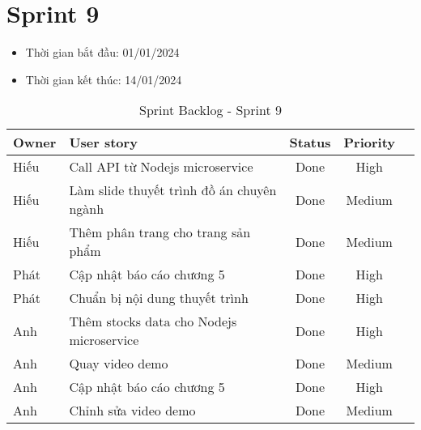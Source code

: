 \section{Sprint 9}
\begin{itemize}
    \item Thời gian bắt đầu: 01/01/2024
    \item Thời gian kết thúc: 14/01/2024
\end{itemize}
\begin{table}[H]
    \begin{tabular}{|m{2.5cm}|m{9cm}|c|c|c|}
    \hline
    \textbf{Owner}  & \textbf{User story}                                & \textbf{Status}  & \textbf{Priority} \\ \hline
    Hiếu               & Call API từ Nodejs microservice                    & Done                              & High         \\ \hline
    Hiếu              & Làm slide thuyết trình đồ án chuyên ngành                    & Done                              & Medium         \\ \hline
    Hiếu               & Thêm phân trang cho trang sản phẩm                    & Done                              & Medium         \\ \hline
    Phát               & Cập nhật báo cáo chương 5                    & Done                              & High        \\ \hline
    Phát               & Chuẩn bị nội dung thuyết trình                    & Done                              & High        \\ \hline
    Anh               & Thêm stocks data cho Nodejs microservice                   & Done                              & High        \\ \hline
    Anh               & Quay video demo                   & Done                              & Medium         \\ \hline
    Anh               & Cập nhật báo cáo chương 5                   & Done                              & High        \\ \hline
    Anh               & Chỉnh sửa video demo                   & Done                              & Medium         \\ \hline
    \end{tabular}
    \caption{Sprint Backlog - Sprint 9}
    \label{tab:sprint-9}
\end{table}
